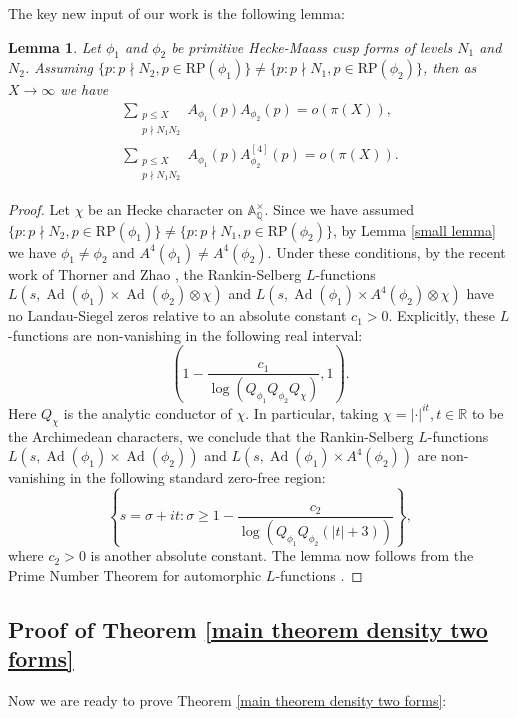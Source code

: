\documentclass[10pt,leqno]{amsart}
\theoremstyle{plain}
\newtheorem{lemma}{Lemma}
\theoremstyle{definition}
\theoremstyle{remark}
\numberwithin{equation}{section}
\newcommand{\Ad}{\operatorname{Ad}}
\newcommand{\RP}{\text{RP}}
\newcommand{\bA}{\mathbb{A}}
\newcommand{\bQ}{\mathbb{Q}}
\begin{document}
The key new input of our work is the following lemma:

\begin{lemma}\label{prime number theorem rankin-selberg}
    Let $\phi_1$ and $\phi_2$ be primitive Hecke-Maass cusp forms of levels $N_1$ and $N_2$. Assuming $\{p:p \nmid N_2,p \in \RP(\phi_1)\} \neq \{p:p \nmid N_1, p \in \RP(\phi_2)\}$, then as $X \to \infty$ we have 
    \begin{align*}
        \sum_{\substack{p \leq X \\ p\nmid N_1N_2}} A_{\phi_1}(p)A_{\phi_2}(p) = o(\pi(X)), \\
        \sum_{\substack{p \leq X \\ p\nmid N_1N_2}} A_{\phi_1}(p)A^{[4]}_{\phi_2}(p) = o(\pi(X)).
    \end{align*}
\end{lemma}

\begin{proof}
    Let $\chi$ be an Hecke character on $\bA_\bQ^\times$. Since we have assumed $\{p:p \nmid N_2,p \in \RP(\phi_1)\} \neq \{p:p \nmid N_1, p \in \RP(\phi_2)\}$, by Lemma \ref{small lemma} we have $\phi_1 \neq \phi_2$ and $A^4(\phi_1) \neq A^4(\phi_2)$. Under these conditions, by the recent work of Thorner and Zhao \cite[Theorem 1.3 (1a)(3)]{ThornerZhao2026}, the Rankin-Selberg $L$-functions $L(s,\Ad(\phi_1) \times \Ad(\phi_2) \otimes \chi)$ and $L(s,\Ad(\phi_1) \times A^4(\phi_2) \otimes \chi)$ have no Landau-Siegel zeros relative to an absolute constant $c_1>0$. Explicitly, these $L$-functions are non-vanishing in the following real interval:
    $$\left(1-\frac{c_1}{\log (Q_{\phi_1}Q_{\phi_2}Q_\chi)},1\right).$$
    Here $Q_\chi$ is the analytic conductor of $\chi$. In particular, taking $\chi = |\cdot|^{it}, t \in \mathbb{R}$ to be the Archimedean characters, we conclude that the Rankin-Selberg $L$-functions $L(s,\Ad(\phi_1) \times \Ad(\phi_2))$ and $L(s,\Ad(\phi_1) \times A^4(\phi_2))$ are non-vanishing in the following standard zero-free region:
    $$\left\{s = \sigma+it:\sigma \geq 1-\frac{c_2}{\log (Q_{\phi_1}Q_{\phi_2}(|t|+3))} \right\},$$
    where $c_2 > 0$ is another absolute constant. The lemma now follows from the Prime Number Theorem for automorphic $L$-functions \cite[Theorem 5.13]{IwaniecKowalskiMR2061214}.
\end{proof}

\subsection{Proof of Theorem \ref{main theorem density two forms}}
Now we are ready to prove Theorem \ref{main theorem density two forms}:
\end{document}
